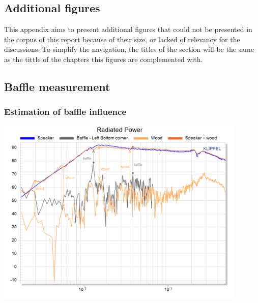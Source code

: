 \documentclass{report}
\begin{document}





\nocite{*}


\begin{appendices}

\chapter{Additional figures}
This appendix aims to present additional figures that could not be presented in the corpus of this report because of their size, or lacked of relevancy for the discussions. To simplify the navigation, the titles of the section will be the same as the tittle of the chapters this figures are complemented with. 


\section{Baffle measurement}
\subsection{Estimation of baffle influence}
\label{Curves:BaffleInfluence}

\begin{center}
	\includegraphics[width=0.9\textwidth]{Appendix/Vib_RadPow}
    \captionsetup{hypcap=false}
    \label{Curves:Baffle_RadPow}
\end{center}



\end{appendices}
\end{document}
